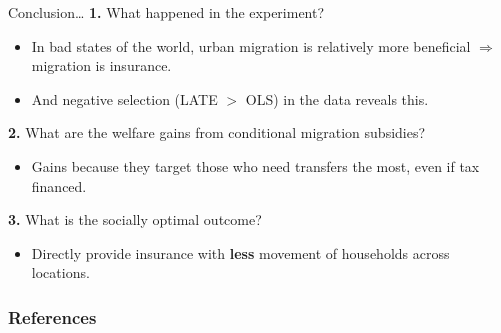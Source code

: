 \documentclass[9pt,pdftex,aspectratio=1610]{beamer}
\theoremstyle{definition}
\begin{document}
\begin{frame}[t]{Conclusion\ldots}
\textbf{1.} What happened in the experiment?
\begin{itemize}
\smallskip
\item In bad states of the world, urban migration is relatively more beneficial $\Rightarrow$ migration is insurance.
\smallskip
\item And negative selection (LATE $>$ OLS) in the data reveals this.
\end{itemize}
\bigskip
\textbf{2.} What are the welfare gains from conditional migration subsidies? \\
\begin{itemize}
\smallskip
\item Gains because they target those who need transfers the most, even if tax financed.
\smallskip
\end{itemize}
\bigskip
\textbf{3.} What is the socially optimal outcome? \\
\begin{itemize}
\item Directly provide insurance with \textbf{less} movement of households across locations.
\smallskip
\end{itemize}
\end{frame}


\appendix

\setcounter{finalframe}{\value{framenumber}}


%

\begin{frame}[allowframebreaks]
\frametitle{References}
\scriptsize

\end{frame}
\end{document}
